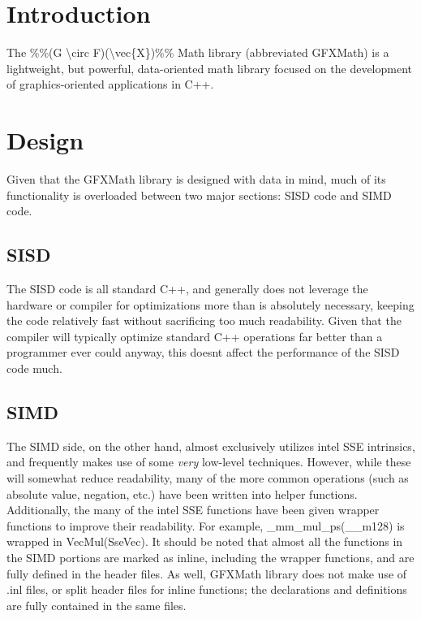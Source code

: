 \hypertarget{index_sec_intro}{}\section{Introduction}\label{index_sec_intro}
The \%\%(G \textbackslash{}circ F)(\textbackslash{}vec\{X\})\%\% Math library (abbreviated G\+F\+X\+Math) is a lightweight, but powerful, data-\/oriented math library focused on the development of graphics-\/oriented applications in C++.\hypertarget{index_sec_design}{}\section{Design}\label{index_sec_design}
Given that the G\+F\+X\+Math library is designed with data in mind, much of its functionality is overloaded between two major sections\+: S\+I\+S\+D code and S\+I\+M\+D code.\hypertarget{index_sec_sisd}{}\subsection{S\+I\+S\+D}\label{index_sec_sisd}




The S\+I\+S\+D code is all standard C++, and generally does not leverage the hardware or compiler for optimizations more than is absolutely necessary, keeping the code relatively fast without sacrificing too much readability. Given that the compiler will typically optimize standard C++ operations far better than a programmer ever could anyway, this doesn\textquotesingle{}t affect the performance of the S\+I\+S\+D code much.\hypertarget{index_sec_simd}{}\subsection{S\+I\+M\+D}\label{index_sec_simd}




The S\+I\+M\+D side, on the other hand, almost exclusively utilizes intel\textregistered{} S\+S\+E intrinsics, and frequently makes use of some {\itshape very} low-\/level techniques. However, while these will somewhat reduce readability, many of the more common operations (such as absolute value, negation, etc.) have been written into helper functions. Additionally, the many of the intel\textregistered{} S\+S\+E functions have been given wrapper functions to improve their readability. For example, {\ttfamily \+\_\+mm\+\_\+mul\+\_\+ps(\+\_\+\+\_\+m128)} is wrapped in {\ttfamily Vec\+Mul(\+Sse\+Vec)}. It should be noted that almost all the functions in the S\+I\+M\+D portions are marked as {\ttfamily inline}, including the wrapper functions, and are fully defined in the header files. As well, G\+F\+X\+Math library does not make use of .inl files, or split header files for {\ttfamily inline} functions; the declarations and definitions are fully contained in the same files. 